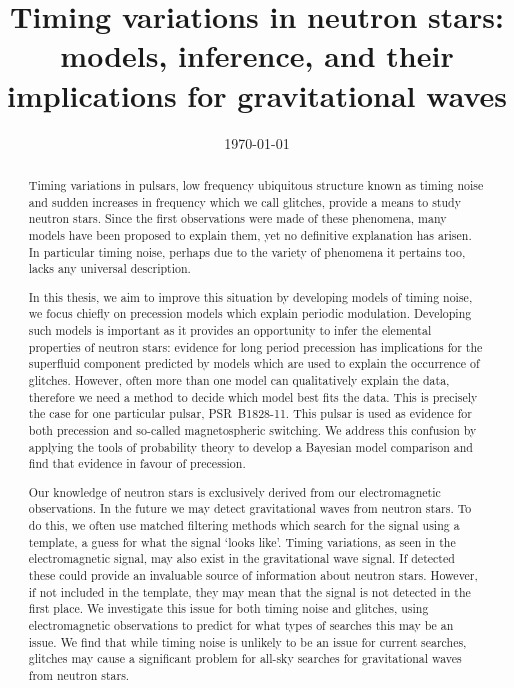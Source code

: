 \documentclass[twoside]{thesis}
\begin{document}
\def\biblio{}

\frontmatter
\title      {Timing variations in neutron stars: models, inference, and their
             implications for gravitational waves}
\date       {\today}
\subject    {}
\keywords   {}
\maketitle

\begin{abstract}

Timing variations in pulsars, low frequency ubiquitous structure
known as timing noise and sudden increases in frequency which we
call glitches, provide a means to study neutron stars. Since the first
observations were made of these phenomena, many models have been proposed to
explain them, yet no definitive explanation has arisen. In particular timing
noise, perhaps due to the variety of phenomena it pertains too, lacks any
universal description.

In this thesis, we aim to improve this situation by developing models of timing
noise, we focus chiefly on precession models which explain periodic modulation.
Developing such models is important as it provides an opportunity to infer the
elemental properties of neutron stars: evidence for long period precession has
implications for the superfluid component predicted by models which are used to
explain the occurrence of glitches. However, often more than one model can
qualitatively explain the data, therefore we need a method to decide which
model best fits the data. This is precisely the case for one particular pulsar, 
PSR~B1828-11. This pulsar is used as evidence for both precession
and so-called magnetospheric switching. We address this confusion by applying the tools of
probability theory to develop a Bayesian model comparison and
find that evidence in favour of precession.

Our knowledge of neutron stars is exclusively derived from our electromagnetic
observations. In the future we may detect gravitational waves from neutron
stars. To do this, we often use matched filtering methods which search for the
signal using a template, a guess for what the signal `looks like'. Timing
variations, as seen in the electromagnetic signal, may also exist in the
gravitational wave signal. If detected these could provide an invaluable source
of information about neutron stars. However, if not included in the template,
they may mean that the signal is not detected in the first place. We
investigate this issue for both timing noise and glitches, using
electromagnetic observations to predict for what types of searches this may be
an issue. We find that while timing noise is unlikely to be an issue for current
searches, glitches may cause a significant problem for all-sky searches
for gravitational waves from neutron stars.




\end{abstract}
\end{document}
